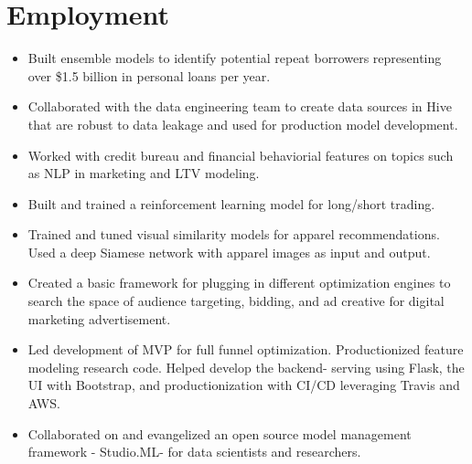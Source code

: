 \documentclass[11pt,a4paper,unicode]{moderncv}
\begin{document}
\vspace*{-6mm}
\maketitle
\vspace*{-6mm}

\section{Employment}

\vspace{-.1cm}
\cvline{}
{\begin{itemize} 
	  \item Built ensemble models to identify potential repeat borrowers representing over \$1.5 billion in personal loans per year. 
	  \item Collaborated with the data engineering team to create data sources in Hive that are robust to data leakage and used for production model development.
	  \item Worked with credit bureau and financial behaviorial features on topics such as NLP in marketing and LTV modeling.
\end{itemize}}
\vspace{-.5cm}


\vspace{-.1cm}
\cvline{}
{\begin{itemize} 
	  \item Built and trained a reinforcement learning model for long/short trading.
	  \item Trained and tuned visual similarity models for apparel recommendations. Used a deep Siamese network with apparel images as input and output. 
	  \item Created a basic framework for plugging in different optimization engines to search the space of audience targeting, bidding, and ad creative for digital marketing advertisement.  
	  \item Led development of MVP for full funnel optimization. Productionized feature modeling research code. Helped develop the backend- serving using Flask, the UI with Bootstrap, and productionization with CI/CD leveraging Travis and AWS. 
	  \item Collaborated on and evangelized an open source model management framework - Studio.ML- for data scientists and researchers.  
\end{itemize}}
\vspace{-.5cm}
\end{document}
